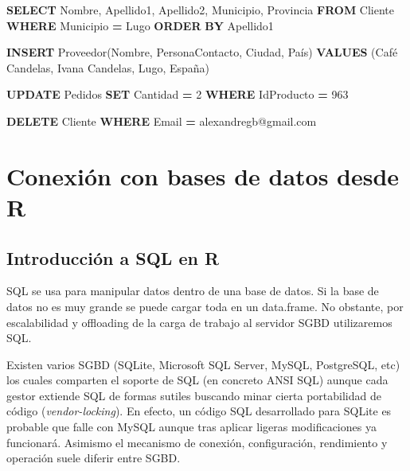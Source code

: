 \documentclass[
]{book}
\newenvironment{Shaded}{\begin{snugshade}}{\end{snugshade}}
\newcommand{\DecValTok}[1]{\textcolor[rgb]{0.00,0.00,0.81}{#1}}
\newcommand{\KeywordTok}[1]{\textcolor[rgb]{0.13,0.29,0.53}{\textbf{#1}}}
\newcommand{\NormalTok}[1]{#1}
\newcommand{\OperatorTok}[1]{\textcolor[rgb]{0.81,0.36,0.00}{\textbf{#1}}}
\newcommand{\StringTok}[1]{\textcolor[rgb]{0.31,0.60,0.02}{#1}}
\begin{document}
\begin{Shaded}
\begin{Highlighting}[]
\KeywordTok{SELECT}\NormalTok{ Nombre, Apellido1, Apellido2, Municipio, Provincia }
\KeywordTok{FROM}\NormalTok{ Cliente}
\KeywordTok{WHERE}\NormalTok{ Municipio }\OperatorTok{=} \StringTok{\textquotesingle{}Lugo\textquotesingle{}}
\KeywordTok{ORDER} \KeywordTok{BY}\NormalTok{ Apellido1}

\KeywordTok{INSERT}\NormalTok{ Proveedor(Nombre, PersonaContacto, Ciudad, País)}
\KeywordTok{VALUES}\NormalTok{ (}\StringTok{\textquotesingle{}Café Candelas\textquotesingle{}}\NormalTok{, }\StringTok{\textquotesingle{}Ivana Candelas\textquotesingle{}}\NormalTok{, }\StringTok{\textquotesingle{}Lugo\textquotesingle{}}\NormalTok{, }\StringTok{\textquotesingle{}España\textquotesingle{}}\NormalTok{)}

\KeywordTok{UPDATE}\NormalTok{ Pedidos}
\KeywordTok{SET}\NormalTok{ Cantidad }\OperatorTok{=} \DecValTok{2}
\KeywordTok{WHERE}\NormalTok{ IdProducto }\OperatorTok{=} \DecValTok{963}

\KeywordTok{DELETE}\NormalTok{ Cliente}
\KeywordTok{WHERE}\NormalTok{ Email }\OperatorTok{=} \StringTok{\textquotesingle{}alexandregb@gmail.com\textquotesingle{}}
\end{Highlighting}
\end{Shaded}

\section{Conexión con bases de datos desde R}\label{conexiuxf3n-con-bases-de-datos-desde-r}

\subsection{Introducción a SQL en R}\label{introducciuxf3n-a-sql-en-r}

SQL se usa para manipular datos dentro de una base de datos. Si la base de datos no es muy grande se puede cargar toda en un data.frame.
No obstante, por escalabilidad y offloading de la carga de trabajo al servidor SGBD utilizaremos SQL.

Existen varios SGBD (SQLite, Microsoft SQL Server, MySQL, PostgreSQL, etc) los cuales comparten el soporte de SQL (en concreto ANSI SQL) aunque cada gestor extiende SQL
de formas sutiles buscando minar cierta portabilidad de código (\emph{vendor-locking}). En efecto, un código SQL desarrollado para SQLite es probable que falle con MySQL
aunque tras aplicar ligeras modificaciones ya funcionará. Asimismo el mecanismo de conexión, configuración, rendimiento y operación suele diferir entre SGBD.
\end{document}
